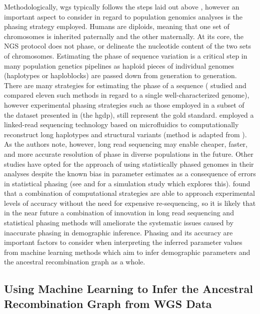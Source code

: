 Methodologically, \gls{wgs} typically follows the steps laid out above , however an important aspect to consider in regard to population genomics analyses is the phasing strategy employed. Humans are diploids, meaning that one set of chromosomes is inherited paternally and the other maternally. At its core, the NGS protocol does not phase, or delineate the nucleotide content of the two sets of chromosomes. Estimating the phase of sequence variation is a critical step in many population genetics pipelines as haploid pieces of individual genomes (haplotypes or haploblocks) are passed down from generation to generation. There are many strategies for estimating the phase of a sequence (\textcite{Choi2018} studied and compared eleven such methods in regard to a single well-characterized genome), however experimental phasing strategies such as those employed in a subset of the dataset presented in \textcite{Bergstrom2019} (the \gls{hgdp}), still represent the gold standard. \textcite{Bergstrom2019} employed a linked-read sequencing technology based on microfluidics to computationally reconstruct long haplotypes and structural variants (method is adapted from \cite{GX2016}). As the authors note, however, long read sequencing may enable cheaper, faster, and more accurate resolution of phase in diverse populations in the future. Other studies have opted for the approach of using statistically phased genomes in their analyses despite the known bias in parameter estimates as a consequence of errors in statistical phasing (see \textcite[Supplemental section 7]{Steinrucken2019} and \textcite{Raghavan2015a} for a simulation study which explores this). \textcite{Choi2018} found that a combination of computational strategies are able to approach experimental levels of accuracy without the need for expensive re-sequencing, so it is likely that in the near future a combination of innovation in long read sequencing and statistical phasing methods will ameliorate the systematic issues caused by inaccurate phasing in demographic inference. Phasing and its accuracy are important factors to consider when interpreting the inferred parameter values from machine learning methods which aim to infer demographic parameters and the ancestral recombination graph as a whole.

\subsection{Using Machine Learning to Infer the Ancestral Recombination Graph from WGS Data}

